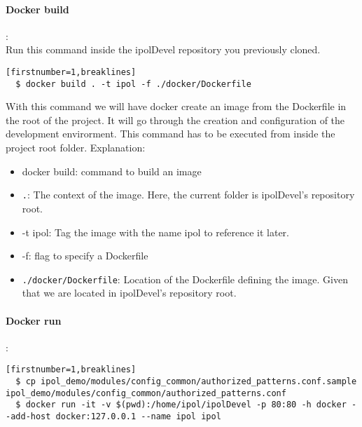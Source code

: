 \documentclass[a4paper,12pt]{article}
\begin{document}
\paragraph{Docker build}:\\

Run this command inside the ipolDevel repository you previously cloned.

\begin{verbatim}[firstnumber=1,breaklines]
  $ docker build . -t ipol -f ./docker/Dockerfile
\end{verbatim}

With this command we will have docker create an image from the Dockerfile in the root of the project. It will go through the creation and configuration of the development envirorment. This command has to be executed from inside the project root folder. Explanation:
\begin{itemize}
  \item docker build: command to build an image
  \item {\tt .}: The context of the image. Here, the current folder is ipolDevel's repository root.
  \item -t ipol: Tag the image with the name ipol to reference it later.
  \item -f: flag to specify a Dockerfile
  \item {\tt ./docker/Dockerfile}: Location of the Dockerfile defining the image. Given that we are located in ipolDevel's repository root.
\end{itemize}

\paragraph{Docker run}:\\
\begin{verbatim}[firstnumber=1,breaklines]
  $ cp ipol_demo/modules/config_common/authorized_patterns.conf.sample ipol_demo/modules/config_common/authorized_patterns.conf
  $ docker run -it -v $(pwd):/home/ipol/ipolDevel -p 80:80 -h docker --add-host docker:127.0.0.1 --name ipol ipol
\end{verbatim}
\end{document}
